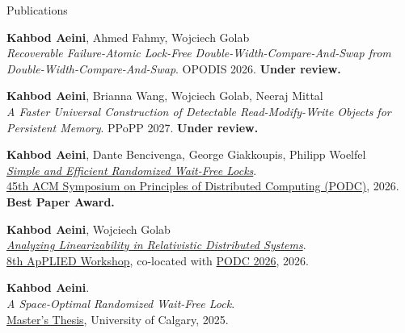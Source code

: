 \documentclass{resume} %
\begin{document}
\begin{rSection}{Publications}

{\bf Kahbod Aeini}, Ahmed Fahmy, Wojciech Golab \\
\textit{Recoverable Failure-Atomic Lock-Free Double-Width-Compare-And-Swap from Double-Width-Compare-And-Swap}.
OPODIS 2026. {\bf Under review.}

{\bf Kahbod Aeini}, Brianna Wang, Wojciech Golab, Neeraj Mittal \\
\textit{A Faster Universal Construction of Detectable Read-Modify-Write Objects for Persistent Memory}.
PPoPP 2027. {\bf Under review.}

{\bf Kahbod Aeini}, Dante Bencivenga, George Giakkoupis, Philipp Woelfel \\
\textit{\href{https://dl.acm.org/doi/10.1145/3796701.3815952}{Simple and Efficient Randomized Wait-Free Locks}}. \\
\href{https://www.podc.org/podc2026/}{45th ACM Symposium on Principles of Distributed Computing (PODC)}, 2026. {\bf Best Paper Award.}

{\bf Kahbod Aeini}, Wojciech Golab \\
\textit{\href{https://dl.acm.org/doi/10.1145/3820355.3820388}{Analyzing Linearizability in Relativistic Distributed Systems}}. \\
\href{https://www.cse.chalmers.se/~elad/ApPLIED2026/index.html}{8th ApPLIED Workshop}, co-located with \href{https://www.podc.org/podc2026/}{PODC 2026}, 2026.

{\bf Kahbod Aeini}. \\
\textit{A Space-Optimal Randomized Wait-Free Lock}. \\
\href{https://ucalgary.scholaris.ca/bitstreams/5ae5cf8f-5009-4db3-b91e-d3dbb679b5bf/download}{Master's Thesis}, University of Calgary, 2025.
\end{rSection}


\end{document}
